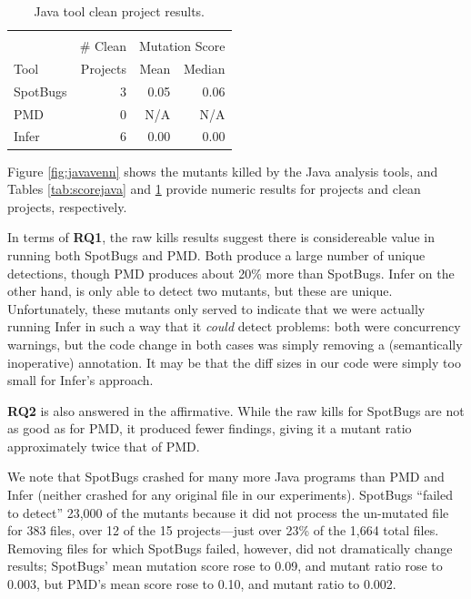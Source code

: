\begin{table}
  \begin{tabular}{l|r|r|r}
    & & \multicolumn{2}{|c|}{} \\
    & \# Clean & \multicolumn{2}{|c|}{Mutation Score} \\
    Tool & Projects & Mean & Median \\
    \hline
    \hline
    SpotBugs & 3 & 0.05 & 0.06 \\
    \hline
    PMD & 0 & N/A & N/A \\
    \hline
    Infer & 6 & 0.00 & 0.00 \\
    \hline
  \end{tabular}
  \caption{Java tool clean project results.}
  \label{tab:cleanjava}
\end{table}

Figure \ref{fig:javavenn} shows the mutants killed by the Java analysis tools, and Tables \ref{tab:scorejava} and \ref{tab:cleanjava} provide numeric results for projects and clean projects, respectively.

In terms of {\bf RQ1}, the raw kills results suggest there is considereable value in running both SpotBugs and PMD.  Both produce a large number of unique detections, though PMD produces about 20\% more than SpotBugs.
Infer on the other hand, is only able to detect two mutants, but these are unique.  Unfortunately, these mutants only served to indicate that we were actually running Infer in such a way that it \emph{could} detect problems:  both were concurrency warnings, but the code change in both cases was simply removing a (semantically inoperative) {\tt \@Override} annotation.  It may be that the diff sizes in our code were simply too small for Infer's approach.

{\bf RQ2} is also answered in the affirmative.  While the raw kills for SpotBugs are not as good as for PMD, it produced fewer findings, giving it a mutant ratio approximately twice that of PMD.

We note that SpotBugs crashed for many more Java programs than PMD and Infer (neither crashed for any original file in our experiments).  SpotBugs ``failed to detect'' 23,000 of the mutants because it did not process the un-mutated file for 383 files, over 12 of the 15 projects---just over 23\% of the 1,664 total files.  Removing files for which SpotBugs failed, however, did not dramatically change results; SpotBugs' mean mutation score rose to 0.09, and mutant ratio rose to 0.003, but PMD's mean score rose to 0.10, and mutant ratio to 0.002.

